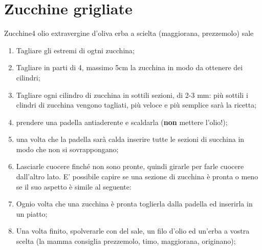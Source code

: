 \section{Zucchine grigliate}

\generalRecipeInfos{}

\ingredienti%
    {Zucchine}{4}%
    {olio extravergine d'oliva}{\qb{}}%
    {erba a scielta (maggiorana, prezzemolo)}{\qb{}}%
    {sale}{\qb{}}%

\begin{enumerate}
    \item Tagliare gli estremi di ogtni zucchina;
    \item Tagliare in parti di 4, massimo 5cm la zucchina in modo da ottenere dei cilindri;
    \item Tagliare ogni cilindro di zucchina in sottili sezioni, di 2-3 mm: più sottili i clindri di zucchina vengono tagliati, più veloce e più semplice sarà la ricetta;
    \item prendere una padella antiaderente e scaldarla (\textbf{non} mettere l'olio!);
    \item una volta che la padella sarà calda inserire tutte le sezioni di succhina in modo che non si sovrappongano;
    \item Lasciarle cuocere finché non sono pronte, quindi girarle per farle cuocere dall'altro lato. E' possibile capire se una sezione di zucchina è pronta o meno se il suo aspetto è simile al seguente:
    \item Ognio volta che una zucchina è pronta toglierla dalla padella ed inserirla in un piatto;
    \item Una volta finito, spolverarle con del sale, un filo d'olio ed un'erba a vostra scelta (la mamma consiglia prezzemolo, timo, maggiorana, originano);
\end{enumerate}

